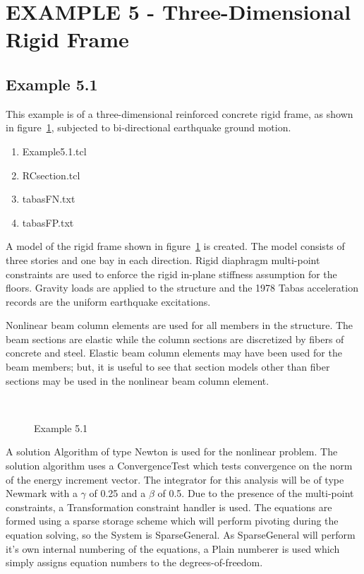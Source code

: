 \documentclass[12pt]{article}
\begin{document}
\pagebreak
\section {EXAMPLE 5 - Three-Dimensional Rigid Frame}


\subsection{Example 5.1}
This example is of a three-dimensional reinforced concrete rigid
frame, as shown in figure~\ref{example5}, subjected to bi-directional
earthquake ground motion.

\vspace{0.2in}  
\begin{enumerate} 
\item Example5.1.tcl
\item RCsection.tcl
\item tabasFN.txt
\item tabasFP.txt
\end{enumerate}

\vspace{0.2in} 

A model of the rigid frame shown in
figure~\ref{example5} is created. The model consists of three stories
and one bay in each direction. Rigid diaphragm multi-point constraints
are used to enforce the rigid in-plane stiffness assumption for the
floors. Gravity loads are applied to  
the structure and the 1978 Tabas acceleration records are the uniform
earthquake excitations.

Nonlinear beam column elements are used for all members in the
structure. The beam sections are elastic while the
column sections are discretized by fibers of concrete and steel.
Elastic beam column elements may have been used for the beam
members; but, it is useful to see that section models other than
fiber sections may be used in the nonlinear beam column element.

\begin{figure}[h]
\begin{center}
\leavevmode
\hbox{%
\epsfxsize=4.0in
}
\end{center}
\caption{Example 5.1}
\label{example5}
\end{figure}

\vspace{0.2in}

A solution Algorithm of type Newton is used for the nonlinear
problem. The solution algorithm uses a ConvergenceTest which tests
convergence on the norm of the energy increment vector. The
integrator for this analysis will be of type Newmark with a $\gamma$
of 0.25 and a $\beta$ of 0.5. Due to the presence of the multi-point
constraints, a Transformation constraint handler is used. The
equations are formed using a sparse storage scheme which will perform
pivoting during the equation solving, so the System is
SparseGeneral. As SparseGeneral will perform it's own internal
numbering of the equations, a Plain numberer is used which simply
assigns equation numbers to the degrees-of-freedom. 
\end{document}

